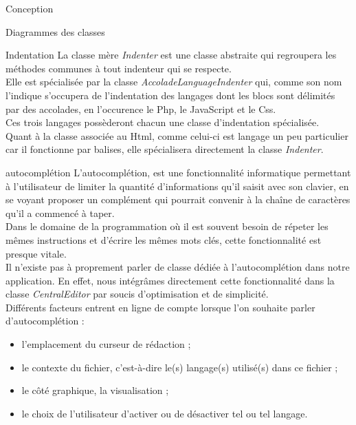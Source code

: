 \documentclass[a4paper, 12pt]{report}
\begin{document}
\begin{part}{Conception}
\begin{chapter}{Diagrammes des classes}
\begin{section}{Indentation}
				La classe mère \emph{Indenter} est une classe abstraite qui regroupera les méthodes communes à tout indenteur qui se respecte.\\
				Elle est spécialisée par la classe \emph{AccoladeLanguageIndenter} qui, comme son nom l'indique s'occupera de l'indentation des
				langages dont les blocs sont délimités par des accolades, en l'occurence le \gls{Php}, le \gls{JavaScript} et le \gls{Css}.\\
				Ces trois langages possèderont chacun une classe d'indentation spécialisée.\\

				Quant à la classe associée au \gls{Html}, comme celui-ci est langage un peu particulier car il fonctionne par balises, elle
				spécialisera directement la classe \emph{Indenter}.
			\end{section}
			\begin{section}{\Gls{autocomplétion}}
				L'autocomplétion, est une fonctionnalité informatique permettant à l'utilisateur de limiter la quantité d'informations qu'il
				saisit avec son clavier, en se voyant proposer un complément qui pourrait convenir à la chaîne de caractères qu'il a
				commencé à taper.\\
				Dans le	domaine de la programmation où il est souvent besoin de répeter les mêmes instructions et d'écrire les mêmes mots clés,
				cette fonctionnalité est presque vitale.\\


				Il n'existe pas à proprement parler de classe dédiée à l'\gls{autocomplétion} dans notre application.
				En effet, nous intégrâmes directement cette fonctionnalité dans la classe \emph{CentralEditor} par soucis d'optimisation
				et de simplicité.\\

				Différents facteurs entrent en ligne de compte lorsque l'on souhaite parler d'\gls{autocomplétion} :
				\begin{itemize}
					\item l'emplacement du curseur de rédaction ;
					\item le contexte du fichier, c'est-à-dire le(s) langage(s) utilisé(s) dans ce fichier ;
					\item le côté graphique, la visualisation ;
					\item le choix de l'utilisateur d'activer ou de désactiver tel ou tel langage.
				\end{itemize}~\\


\end{section}
\end{chapter}
\end{part}
\end{document}
